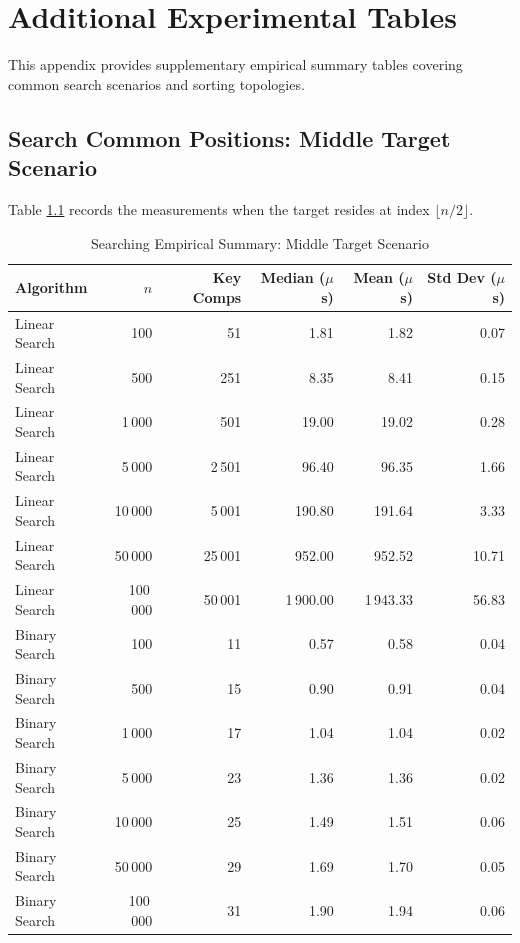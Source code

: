 \documentclass[11pt,a4paper,oneside]{report}
\theoremstyle{definition}
\begin{document}
\chapter{Additional Experimental Tables}
\label{app:tables}

This appendix provides supplementary empirical summary tables covering common search scenarios and sorting topologies.

\section{Search Common Positions: Middle Target Scenario}
Table \ref{tab:search_middle_summary} records the measurements when the target resides at index $\lfloor n / 2 \rfloor$.

\begin{table}[htbp]
\centering
\caption{Searching Empirical Summary: Middle Target Scenario}
\label{tab:search_middle_summary}
\small
\begin{tabular*}{\textwidth}{@{\extracolsep{\fill}}lrrrrr}
\toprule
\textbf{Algorithm} & $n$ & \textbf{Key Comps} & \textbf{Median ($\mu$s)} & \textbf{Mean ($\mu$s)} & \textbf{Std Dev ($\mu$s)} \\
\midrule
Linear Search & 100 & 51 & 1.81 & 1.82 & 0.07 \\
Linear Search & 500 & 251 & 8.35 & 8.41 & 0.15 \\
Linear Search & 1\,000 & 501 & 19.00 & 19.02 & 0.28 \\
Linear Search & 5\,000 & 2\,501 & 96.40 & 96.35 & 1.66 \\
Linear Search & 10\,000 & 5\,001 & 190.80 & 191.64 & 3.33 \\
Linear Search & 50\,000 & 25\,001 & 952.00 & 952.52 & 10.71 \\
Linear Search & 100\,000 & 50\,001 & 1\,900.00 & 1\,943.33 & 56.83 \\
\midrule
Binary Search & 100 & 11 & 0.57 & 0.58 & 0.04 \\
Binary Search & 500 & 15 & 0.90 & 0.91 & 0.04 \\
Binary Search & 1\,000 & 17 & 1.04 & 1.04 & 0.02 \\
Binary Search & 5\,000 & 23 & 1.36 & 1.36 & 0.02 \\
Binary Search & 10\,000 & 25 & 1.49 & 1.51 & 0.06 \\
Binary Search & 50\,000 & 29 & 1.69 & 1.70 & 0.05 \\
Binary Search & 100\,000 & 31 & 1.90 & 1.94 & 0.06 \\
\bottomrule
\end{tabular*}
\end{table}
\end{document}
